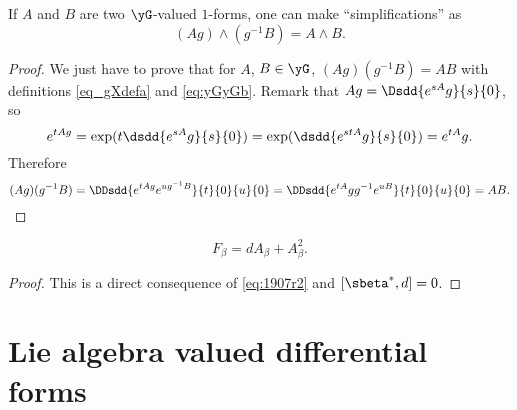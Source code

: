 																						\begin{lemma}
																						If $A$ and $B$ are two $\yG$-valued $1$-forms, one can make  ``simplifications'' as
																						\begin{equation}
																						(Ag)\wedge(g^{-1} B)=A\wedge B.
																						\end{equation}
																						\label{lem:simplif}
																						\end{lemma}

																						\begin{proof}
																						We just have to prove that for $A$, $B\in\yG$, $(Ag)(g^{-1} B)=AB$ with definitions \eqref{eq_gXdefa} and \eqref{eq:yGyGb}. Remark that $Ag=\Dsdd{e^{sA}g}{s}{0}$, so
																						\[
																							e^{tAg}=\exp(t\dsdd{e^{sA}g}{s}{0})=\exp(\dsdd{e^{stA}g}{s}{0})=e^{tA}g.
																							\]
																							Therefore
																							\[
																								(Ag)(g^{-1} B)=\DDsdd{  e^{tAg}e^{ug^{-1} B}  }{t}{0}{u}{0}=\DDsdd{  e^{tA}gg^{-1} e^{uB}  }{t}{0}{u}{0}=AB.
																								\]
																								\end{proof}

																								\begin{lemma}
																								\begin{equation}
																								F_{\beta}=dA_{\beta}+A_{\beta}^2.
																								\end{equation}
																								\end{lemma}

																								\begin{proof}
																								This is  a direct consequence of \eqref{eq:1907r2} and $[\sbeta^*,d]=0$.
																								\end{proof}

																								\section{Lie algebra valued differential forms}	\label{SecLiaAlgformval}

